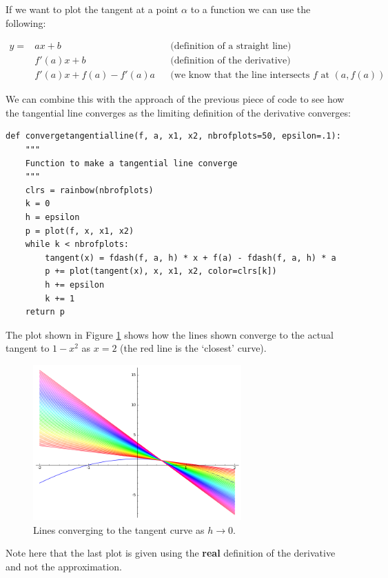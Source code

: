 \documentclass[a4paper]{article}
\begin{document}
If we want to plot the tangent at a point $\alpha$ to a function we can use the following:

\begin{align}
y=&ax+b&&\text{(definition of a straight line)}\nonumber\\
  &f'(a)x+b&&\text{(definition of the derivative)}\nonumber\\
  &f'(a)x+f(a)-f'(a)a&&\text{(we know that the line intersects $f$ at $(a,f(a))$}\nonumber
\end{align}

We can combine this with the approach of the previous piece of code to see how the tangential line converges as the limiting definition of the derivative converges:

\begin{verbatim}
def convergetangentialline(f, a, x1, x2, nbrofplots=50, epsilon=.1):
    """
    Function to make a tangential line converge
    """
    clrs = rainbow(nbrofplots)
    k = 0
    h = epsilon
    p = plot(f, x, x1, x2)
    while k < nbrofplots:
        tangent(x) = fdash(f, a, h) * x + f(a) - fdash(f, a, h) * a
        p += plot(tangent(x), x, x1, x2, color=clrs[k])
        h += epsilon
        k += 1
    return p
\end{verbatim}

The plot shown in Figure \ref{lines} shows how the lines shown converge to the actual tangent to $1-x^2$ as $x=2$ (the red line is the `closest' curve).

\begin{figure}[!htbp]
\begin{center}
\includegraphics[width=8cm]{sage0.png}
\end{center}
\caption{Lines converging to the tangent curve as $h\to0$.}\label{lines}
\end{figure}

Note here that the last plot is given using the \textbf{real} definition of the derivative and not the approximation.
\end{document}
